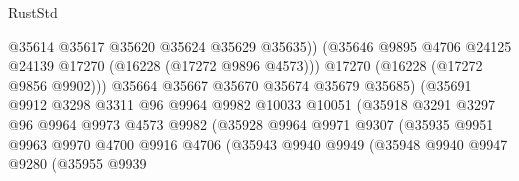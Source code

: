 \begin{lexlean}{RustStd}
\begin{coremodule}
                                        @35614
                                        @35617
                                        @35620
                                        @35624
                                        @35629
                                        @35635))
                                    (@35646
                                      @9895
                                      @4706
                                      @24125
                                      @24139
                                      @17270
                                      (@16228 (@17272 @9896 @4573)))
                                    @17270
                                    (@16228 (@17272 @9856 @9902)))
                                  @35664
                                  @35667
                                  @35670
                                  @35674
                                  @35679
                                  @35685)
                                (@35691
                                  @9912
                                  @3298
                                  @3311
                                  @96
                                  @9964
                                  @9982
                                  @10033
                                  @10051
                                  (@35918
                                    @3291
                                    @3297
                                    @96
                                    @9964
                                    @9973
                                    @4573
                                    @9982
                                    (@35928
                                      @9964
                                      @9971
                                      @9307
                                      (@35935
                                        @9951
                                        @9963
                                        @9970
                                        @4700
                                        @9916
                                        @4706
                                        (@35943
                                          @9940
                                          @9949
                                          (@35948
                                            @9940
                                            @9947
                                            @9280
                                            (@35955
                                              @9939

\end{coremodule}
\end{lexlean}

